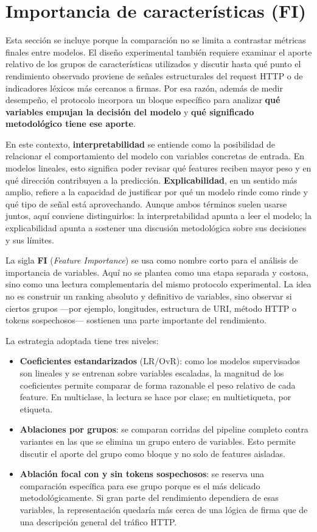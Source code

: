 \documentclass[12pt,oneside]{report}
\begin{document}
\section{Importancia de características (FI)}
Esta sección se incluye porque la comparación no se limita a contrastar métricas finales entre modelos. El diseño experimental también requiere examinar el aporte relativo de los grupos de características utilizados y discutir hasta qué punto el rendimiento observado proviene de señales estructurales del request HTTP o de indicadores léxicos más cercanos a firmas. Por esa razón, además de medir desempeño, el protocolo incorpora un bloque específico para analizar \textbf{qué variables empujan la decisión del modelo} y \textbf{qué significado metodológico tiene ese aporte}.

En este contexto, \textbf{interpretabilidad} se entiende como la posibilidad de relacionar el comportamiento del modelo con variables concretas de entrada. En modelos lineales, esto significa poder revisar qué features reciben mayor peso y en qué dirección contribuyen a la predicción. \textbf{Explicabilidad}, en un sentido más amplio, refiere a la capacidad de justificar por qué un modelo rinde como rinde y qué tipo de señal está aprovechando. Aunque ambos términos suelen usarse juntos, aquí conviene distinguirlos: la interpretabilidad apunta a leer el modelo; la explicabilidad apunta a sostener una discusión metodológica sobre sus decisiones y sus límites.

La sigla \textbf{FI} (\textit{Feature Importance}) se usa como nombre corto para el análisis de importancia de variables. Aquí no se plantea como una etapa separada y costosa, sino como una lectura complementaria del mismo protocolo experimental. La idea no es construir un ranking absoluto y definitivo de variables, sino observar si ciertos grupos ---por ejemplo, longitudes, estructura de URI, método HTTP o tokens sospechosos--- sostienen una parte importante del rendimiento.

La estrategia adoptada tiene tres niveles:
\begin{itemize}[leftmargin=*]
  \item \textbf{Coeficientes estandarizados} (LR/OvR): como los modelos supervisados son lineales y se entrenan sobre variables escaladas, la magnitud de los coeficientes permite comparar de forma razonable el peso relativo de cada feature. En multiclase, la lectura se hace por clase; en multietiqueta, por etiqueta.
  \item \textbf{Ablaciones por grupos}: se comparan corridas del pipeline completo contra variantes en las que se elimina un grupo entero de variables. Esto permite discutir el aporte del grupo como bloque y no solo de features aisladas.
  \item \textbf{Ablación focal con y sin tokens sospechosos}: se reserva una comparación específica para ese grupo porque es el más delicado metodológicamente. Si gran parte del rendimiento dependiera de esas variables, la representación quedaría más cerca de una lógica de firma que de una descripción general del tráfico HTTP.
\end{itemize}
\end{document}

